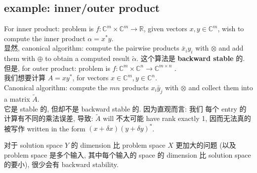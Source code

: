 \documentclass[lang=cn,11pt]{elegantbook}
\begin{document}
\subsection{example: inner/outer product }
For inner product: problem is $f: \mathbb{C}^m\times \mathbb{C}^m \to \mathbb{R}$,  given vectors $x, y \in \mathbb{C}^m$, wish to compute the inner product $\alpha=x^* y$.\\
显然, canonical algorithm: compute the pairwise products $\bar{x}_i y_i$ with $\otimes$ and add them with $\oplus$ to obtain a computed result $\tilde{\alpha}$. 
这个算法是 \textbf{backward stable} 的.\\
但是, for outer product: problem is $f:  \mathbb{C}^m \times  \mathbb{C}^n \to  \mathbb{C}^{m\times n}$ .\\
我们想要计算 $A=x y^*$, for vectors $x \in \mathbb{C}^m, y \in \mathbb{C}^n$. \\
Canonical algorithm: compute the $m n$ products $x_i \bar{y}_j$ with $\otimes$ and collect them into a matrix $\tilde{A}$. \\
它是 stable 的, 但却不是 backward stable 的. 因为直观而言: 我们 每个 entry 的计算有不同的乘法误差, 导致:  $\tilde{A}$ will 不太可能 have rank exactly 1, 因而无法真的被写作 written in the form $(x+\delta x)(y+\delta y)^*$. \\
\begin{remark}
对于 solution space $Y$ 的 dimension 比 problem space $X$ 更加大的问题 (以及 problem space 是多个输入, 其中每个输入的 space 的 dimension 比 solution space 的要小), 很少会有 backward stability.
\end{remark}
\end{document}
